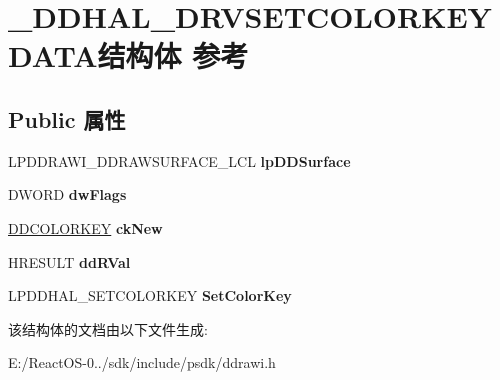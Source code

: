 \hypertarget{struct___d_d_h_a_l___d_r_v_s_e_t_c_o_l_o_r_k_e_y_d_a_t_a}{}\section{\+\_\+\+D\+D\+H\+A\+L\+\_\+\+D\+R\+V\+S\+E\+T\+C\+O\+L\+O\+R\+K\+E\+Y\+D\+A\+T\+A结构体 参考}
\label{struct___d_d_h_a_l___d_r_v_s_e_t_c_o_l_o_r_k_e_y_d_a_t_a}
\subsection*{Public 属性}
\begin{DoxyCompactItemize}
\item 
\mbox{\label{struct___d_d_h_a_l___d_r_v_s_e_t_c_o_l_o_r_k_e_y_d_a_t_a_a052add2fad0d8e72ca018a89dad47ff1}} 
L\+P\+D\+D\+R\+A\+W\+I\+\_\+\+D\+D\+R\+A\+W\+S\+U\+R\+F\+A\+C\+E\+\_\+\+L\+CL {\bfseries lp\+D\+D\+Surface}
\item 
\mbox{\label{struct___d_d_h_a_l___d_r_v_s_e_t_c_o_l_o_r_k_e_y_d_a_t_a_a6ceb1eef3d6adb341fb421989fd66a2f}} 
D\+W\+O\+RD {\bfseries dw\+Flags}
\item 
\mbox{\label{struct___d_d_h_a_l___d_r_v_s_e_t_c_o_l_o_r_k_e_y_d_a_t_a_a8afef91b10a2b6ca30f1da970404d6ff}} 
\hyperlink{struct_d_d_c_o_l_o_r_k_e_y}{D\+D\+C\+O\+L\+O\+R\+K\+EY} {\bfseries ck\+New}
\item 
\mbox{\label{struct___d_d_h_a_l___d_r_v_s_e_t_c_o_l_o_r_k_e_y_d_a_t_a_a96c075ef5490ed403bfd06c8b96e9dcd}} 
H\+R\+E\+S\+U\+LT {\bfseries dd\+R\+Val}
\item 
\mbox{\label{struct___d_d_h_a_l___d_r_v_s_e_t_c_o_l_o_r_k_e_y_d_a_t_a_ab74dbe8ecc62113a18c259fe672a3df1}} 
L\+P\+D\+D\+H\+A\+L\+\_\+\+S\+E\+T\+C\+O\+L\+O\+R\+K\+EY {\bfseries Set\+Color\+Key}
\end{DoxyCompactItemize}


该结构体的文档由以下文件生成\+:\begin{DoxyCompactItemize}
\item 
E\+:/\+React\+O\+S-\/0../sdk/include/psdk/ddrawi.\+h\end{DoxyCompactItemize}
